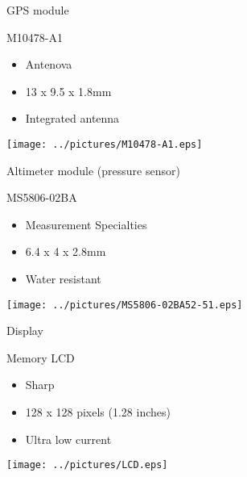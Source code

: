 \documentclass[compress,red]{beamer}
\begin{document}
\begin{frame}{GPS module}

  \begin{block}{M10478-A1}
    \begin{itemize}
    \item Antenova
    \item 13 x 9.5 x 1.8mm
    \item Integrated antenna
    \end{itemize}
  \end{block}

  \begin{center}
    \texttt{[image: ../pictures/M10478-A1.eps]}
  \end{center}

  \note[item]{}

\end{frame}

\begin{frame}{Altimeter module (pressure sensor)}

  \begin{block}{MS5806-02BA}
    \begin{itemize}
    \item Measurement Specialties
    \item 6.4 x 4 x 2.8mm
    \item Water resistant
    \end{itemize}
  \end{block}

  \begin{center}
    \texttt{[image: ../pictures/MS5806-02BA52-51.eps]}
  \end{center}

  \note[item]{}

\end{frame}

\begin{frame}{Display}

  \begin{block}{Memory LCD}
    \begin{itemize}
    \item Sharp
    \item 128 x 128 pixels (1.28 inches)
    \item Ultra low current
    \end{itemize}
  \end{block}


  \begin{center}
    \texttt{[image: ../pictures/LCD.eps]}
  \end{center}

  \begin{center}

  \end{center}

  \note[item]{}

\end{frame}
\end{document}
